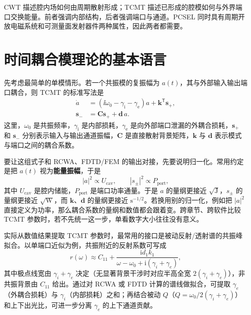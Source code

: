 \begin{IntuitionBox}
CWT 描述腔内场如何由周期散射形成；TCMT 描述已形成的腔模如何与外界端口交换能量。前者强调内部结构，后者强调端口与通道。PCSEL 同时具有周期开放电磁系统和可测量面发射器件两种属性，因此两者都需要。
\end{IntuitionBox}

\section{时间耦合模理论的基本语言}
先考虑最简单的单模情形。若一个共振模的复振幅为 $a(t)$，其与外部输入输出端口耦合，则 TCMT 的标准写法是
\begin{align}
\dot a &= \left(\ii\omega_0-\gamma_\mathrm{i}-\gamma_\mathrm{e}\right)a + \bm{k}^{\mathsf T}\bm{s}_+,
\label{eq:tcmt_single_a}\\
\bm{s}_- &= \mathbf{C}\bm{s}_+ + \bm{d}\,a.
\label{eq:tcmt_single_s}
\end{align}
这里，$\omega_0$ 是共振频率，$\gamma_\mathrm{i}$ 是内部损耗，$\gamma_\mathrm{e}$ 是向外部端口泄漏的外耦合损耗，$\bm{s}_+$ 和 $\bm{s}_-$ 分别表示输入与输出通道振幅，$\mathbf{C}$ 是直接散射背景矩阵，$\bm{k}$ 与 $\bm{d}$ 表示模式与端口之间的耦合系数。

要让这组式子和 RCWA、FDTD/FEM 的输出对接，先要说明归一化。常用约定是把 $a(t)$ 视为\textbf{能量振幅}，于是
\begin{equation}
|a|^2 \propto U_{\mathrm{cav}},
\qquad
|s_\pm|^2 \propto P_{\mathrm{port}},
\label{eq:tcmt_norm_units}
\end{equation}
其中 $U_{\mathrm{cav}}$ 是腔内储能，$P_{\mathrm{port}}$ 是端口功率通量。于是 $a$ 的量纲更接近 $\sqrt{\mathrm{J}}$，$s_\pm$ 的量纲更接近 $\sqrt{\mathrm{W}}$，而 $\bm{k}$、$\bm{d}$ 的量纲更接近 $\mathrm{s}^{-1/2}$。若换用别的归一化，例如把 $|a|^2$ 直接定义为功率，那么耦合系数的量纲和数值都会跟着变。跨章节、跨软件比较 TCMT 参数时，若不先统一这一步，单看数字大小往往没有意义。

实际从数值结果提取 TCMT 参数时，最常用的接口是被动反射/透射谱的共振峰拟合。以单端口近似为例，共振附近的反射系数可写成
\begin{equation}
r(\omega)\approx C_{11}+\frac{\mathrm{i}d_1k_1}{\omega-\omega_0+\mathrm{i}(\gamma_i+\gamma_e)},
\label{eq:tcmt_r_fit}
\end{equation}
其中极点线宽由 $\gamma_i+\gamma_e$ 决定（无显著背景干涉时对应半高全宽 $2(\gamma_i+\gamma_e)$），非共振背景由 $C_{11}$ 给出。通过对 RCWA 或 FDTD 计算的谱线做拟合，可提取 $\gamma_e$（外耦合损耗）与 $\gamma_i$（内部损耗）之和；再结合被动 $Q$（$Q=\omega_0/2(\gamma_i+\gamma_e)$）和上下出光比，可进一步分离 $\gamma_e$ 的上下通道贡献。

